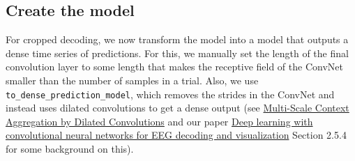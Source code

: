 \documentclass[11pt]{article}
\begin{document}
    \subsection{Create the model}\label{create-the-model}

    For cropped decoding, we now transform the model into a model that
outputs a dense time series of predictions. For this, we manually set
the length of the final convolution layer to some length that makes the
receptive field of the ConvNet smaller than the number of samples in a
trial. Also, we use \texttt{to\_dense\_prediction\_model}, which removes
the strides in the ConvNet and instead uses dilated convolutions to get
a dense output (see \href{https://arxiv.org/abs/1511.07122}{Multi-Scale
Context Aggregation by Dilated Convolutions} and our paper
\href{https://arxiv.org/abs/1703.05051}{Deep learning with convolutional
neural networks for EEG decoding and visualization} Section 2.5.4 for
some background on this).
\end{document}
